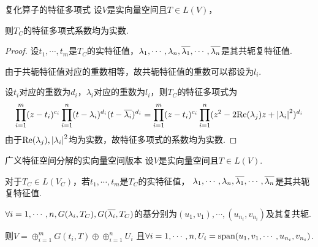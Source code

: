 \begin{theorem}[9.20]\label{thm 9.20} 复化算子的特征多项式 \:
    设\(V\)是实向量空间且\(T \in L(V)\)，
    
    则\(T_C\)的特征多项式系数均为实数.
\end{theorem}

\begin{proof}
    设\(t_1,\cdots,t_m\)是\(T_C\)的实特征值，\(\lambda_1,\cdots,\lambda_n,\ol{\lambda_1},\cdots,\ol{\lambda_n}\)是其共轭复特征值.

    由于共轭特征值对应的重数相等，故共轭特征值的重数可以都设为\(l_i\).
    
    设\(t_i\)对应的重数为\(d_i\)，\(\lambda_i\)对应的重数为\(l_i\)，则\(T_C\)的特征多项式为
        \begin{align*}
            \prod_{i=1}^m (z-t_i)^{c_i} \prod_{i=1}^n (t-\lambda_i)^{d_i}(t-\ol{\lambda_i})^{d_i}
            =\prod_{i=1}^m (z-t_i)^{c_i} \prod_{i=1}^n (z^2-2\mathrm{Re}(\lambda_j)z+\abs*{\lambda_i}^2)^{d_i}
        \end{align*}
    由于\(\mathrm{Re}(\lambda_j),\abs*{\lambda_i}^2\)均为实数，故特征多项式的系数均为实数.
\end{proof}

\newpage

\begin{theorem}[9.1*]\label{thm 9.1*} 广义特征空间分解的实向量空间版本 \:
    设\(V\)是实向量空间且\(T \in L(V)\).

    对于\(T_C \in L(V_C)\)，若\(t_1,\cdots,t_m\)是\(T_C\)的实特征值，
    \(\lambda_1,\cdots,\lambda_n,\ol{\lambda_1},\cdots,\ol{\lambda_n}\)是其共轭复特征值.
    
    \(\forall i=1,\cdots,n,G(\lambda_i,T_C),G(\ol{\lambda_i},T_C)\)的基分别为\((u_1,v_1),\cdots,(u_{n_i},v_{n_i})\)及其复共轭.
    
    则\(V=\oplus_{i=1}^m G(t_i,T) \oplus \oplus_{i=1}^n U_i\)
    且\(\forall i=1,\cdots,n,U_i=\altspan(u_1,v_1,\cdots,u_{n_i},v_{n_i})\).
\end{theorem}

